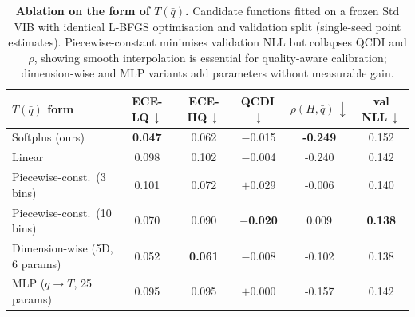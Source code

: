 \begin{table}[!tbp]
\centering
\caption{\textbf{Ablation on the form of $T(\bar q)$.}
Candidate functions fitted on a frozen Std VIB with identical L-BFGS optimisation and validation split (single-seed point estimates). Piecewise-constant minimises validation NLL but collapses QCDI and $\rho$, showing smooth interpolation is essential for quality-aware calibration; dimension-wise and MLP variants add parameters without measurable gain.}
\label{tab:ablation}
\vspace{4pt}
\footnotesize
\setlength{\tabcolsep}{5pt}
\renewcommand{\arraystretch}{1.05}
\begin{tabular}{lccccc}
\toprule
$T(\bar q)$ form & ECE-LQ\,$\downarrow$ & ECE-HQ\,$\downarrow$ & QCDI\,$\downarrow$ & $\rho(H,\bar q)\,\downarrow$ & val NLL\,$\downarrow$ \\
\midrule
Softplus (ours) & \textbf{0.047} & 0.062 & $-$0.015 & \textbf{-0.249} & 0.152 \\
Linear & 0.098 & 0.102 & $-$0.004 & -0.240 & 0.142 \\
Piecewise-const.\ (3 bins) & 0.101 & 0.072 & $+$0.029 & -0.006 & 0.140 \\
\midrule
Piecewise-const.\ (10 bins) & 0.070 & 0.090 & \textbf{$-$0.020} & 0.009 & \textbf{0.138} \\
Dimension-wise (5D, 6 params) & 0.052 & \textbf{0.061} & $-$0.008 & -0.102 & 0.138 \\
MLP ($q\to T$, 25 params) & 0.095 & 0.095 & $+$0.000 & -0.157 & 0.142 \\
\bottomrule
\end{tabular}
\vspace{-4pt}
\end{table}
